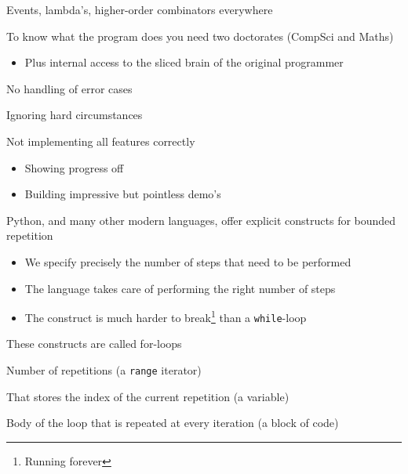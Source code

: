 \documentclass{beamer}
\begin{document}
\begin{slide}{
\item Events, lambda's, higher-order combinators everywhere
\item To know what the program does you need two doctorates (CompSci and Maths)
\begin{itemize}
\item Plus internal access to the sliced brain of the original programmer
\end{itemize}
}\end{slide}

\begin{slide}{
\item No handling of error cases
\item Ignoring hard circumstances
\pause
\item Not implementing all features correctly
\begin{itemize}
\item Showing progress off
\item Building impressive but pointless demo's
\end{itemize}
}\end{slide}

\begin{slide}{
\item Python, and many other modern languages, offer explicit constructs for bounded repetition
\begin{itemize}
\item We specify precisely the number of steps that need to be performed
\item The language takes care of performing the right number of steps
\item The construct is much harder to break\footnote{Running forever} than a \texttt{while}-loop
\end{itemize}
\item These constructs are called for-loops
}\end{slide}

\begin{slide}{
\item Number of repetitions (a \texttt{range} iterator)
\item That stores the index of the current repetition (a variable)
\item Body of the loop that is repeated at every iteration (a block of code)
}\end{slide}
\end{document}
